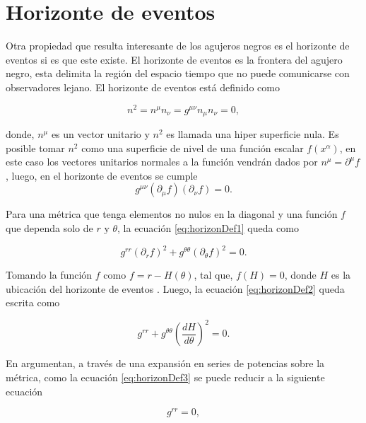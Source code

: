\section{Horizonte de eventos}

Otra propiedad que resulta interesante de los agujeros negros es el horizonte de eventos si es que este existe. El horizonte de eventos es la frontera del agujero negro, esta delimita la región del espacio tiempo que no puede comunicarse con observadores lejano. El horizonte de eventos está definido como \cite{EventHorizonDef}

\begin{equation}
    n^2=n^\mu n_{\nu}=g^{\mu\nu}n_\mu n_\nu=0,
\end{equation}

donde, $n^\mu$ es un vector unitario y $n^2$ es llamada una hiper superficie nula. Es posible tomar $n^2$ como una superficie de nivel de una función escalar $f(x^\alpha)$, en este caso los vectores unitarios normales a la función vendrán dados por $n^\mu=\partial^\mu f$ \cite{EventHorizonsKerr}, luego, en el horizonte de eventos se cumple
\begin{equation}
    g^{\mu\nu}(\partial_{\mu}f)(\partial_\nu f)=0.
    \label{eq:horizonDef1}
\end{equation}

Para una métrica que tenga elementos no nulos en la diagonal y una función $f$ que dependa solo de $r \text{ y } \theta$, la ecuación \eqref{eq:horizonDef1} queda como

\begin{equation}
    g^{rr}(\partial_r f)^2+g^{\theta\theta}(\partial_\theta f)^2=0.
    \label{eq:horizonDef2}
\end{equation}

Tomando la función $f$ como $f=r-H(\theta)$, tal que, $f(H)=0$, donde $H$ es la ubicación del horizonte de eventos \cite{EventHorizonsKerr}. Luego, la ecuación \eqref{eq:horizonDef2} queda escrita como

\begin{equation}
    g^{rr}+g^{\theta\theta}\left(\dfrac{dH}{d\theta}\right)^2=0.
    \label{eq:horizonDef3}
\end{equation}

En \cite{EventHorizonsKerr} argumentan, a través de una expansión en series de potencias sobre la métrica, como la ecuación \eqref{eq:horizonDef3} se puede reducir a la siguiente ecuación

\begin{equation}
    g^{rr}=0,
    \label{eq:eventHorizon}
\end{equation}

